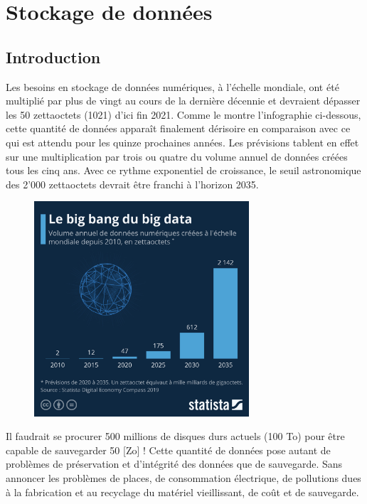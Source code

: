 \documentclass[11pt, a4paper]{book}
\begin{document}
\setcounter{chapter}{4}


\chapter{Stockage de données}
\section{Introduction}

Les besoins en stockage de données numériques, à l’échelle mondiale, ont été multiplié par plus de vingt au cours de la dernière décennie et devraient dépasser les 50 zettaoctets (1021) d’ici fin 2021. Comme le montre l’infographie ci-dessous, cette quantité de données apparaît finalement dérisoire en comparaison avec ce qui est attendu pour les quinze prochaines années. Les prévisions tablent en effet sur une multiplication par trois ou quatre du volume annuel de données créées tous les cinq ans. Avec ce rythme exponentiel de croissance, le seuil astronomique des 2’000 zettaoctets devrait être franchi à l’horizon 2035.

\begin{figure}[ht!]
\centering
\includegraphics[width=8cm]{images/statista.jpeg}
\end{figure}

Il faudrait se procurer 500 millions de disques durs actuels (100 To) pour être capable de sauvegarder 50 [Zo] ! Cette quantité de données pose autant de problèmes de préservation et d’intégrité des données que de sauvegarde. Sans annoncer les problèmes de places, de consommation électrique, de pollutions dues à la fabrication et au recyclage du matériel vieillissant, de coût et de sauvegarde.
\end{document}
